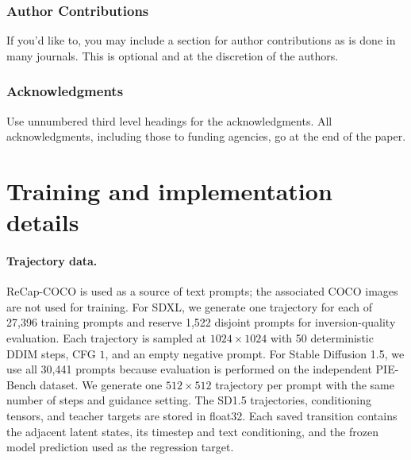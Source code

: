 \documentclass{article} %
\begin{document}
\subsubsection*{Author Contributions}
If you'd like to, you may include  a section for author contributions as is done
in many journals. This is optional and at the discretion of the authors.

\subsubsection*{Acknowledgments}
Use unnumbered third level headings for the acknowledgments. All
acknowledgments, including those to funding agencies, go at the end of the paper.





\appendix
\section{Training and implementation details}
\label{sec:implementation-details}

\paragraph{Trajectory data.}
ReCap-COCO is used as a source of text prompts; the associated COCO images are not used for training. For SDXL, we generate one trajectory for each of 27,396 training prompts and reserve 1,522 disjoint prompts for inversion-quality evaluation. Each trajectory is sampled at $1024\times1024$ with 50 deterministic DDIM steps, CFG $1$, and an empty negative prompt. For Stable Diffusion 1.5, we use all 30,441 prompts because evaluation is performed on the independent PIE-Bench dataset. We generate one $512\times512$ trajectory per prompt with the same number of steps and guidance setting. The SD1.5 trajectories, conditioning tensors, and teacher targets are stored in float32. Each saved transition contains the adjacent latent states, its timestep and text conditioning, and the frozen model prediction used as the regression target.
\end{document}

